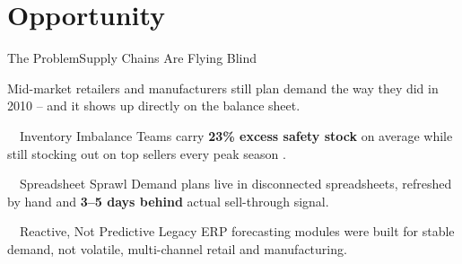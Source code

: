 \section{Opportunity}

\begin{frame}{The Problem}{Supply Chains Are Flying Blind}

  Mid-market retailers and manufacturers still plan demand the way they did in 2010 --
  and it shows up directly on the balance sheet.

  \vspace{0.4cm}

  \begin{minipage}[t]{0.31\textwidth}
    \begin{panelbox}{\textcolor{accentMint}{\faExclamationTriangle}\ \ Inventory Imbalance}
      \small Teams carry \textbf{23\% excess safety stock} on average while still stocking
      out on top sellers every peak season \cite{synapse2026benchmark}.
    \end{panelbox}
  \end{minipage}\hfill
  \begin{minipage}[t]{0.31\textwidth}
    \begin{panelbox}{\textcolor{accentMint}{\faFile}\ \ Spreadsheet Sprawl}
      \small Demand plans live in disconnected spreadsheets, refreshed by hand and
      \textbf{3--5 days behind} actual sell-through signal.
    \end{panelbox}
  \end{minipage}\hfill
  \begin{minipage}[t]{0.31\textwidth}
    \begin{panelbox}{\textcolor{accentMint}{\faClock}\ \ Reactive, Not Predictive}
      \small Legacy ERP forecasting modules were built for stable demand, not
      volatile, multi-channel retail and manufacturing.
    \end{panelbox}
  \end{minipage}
  \par

\end{frame}

